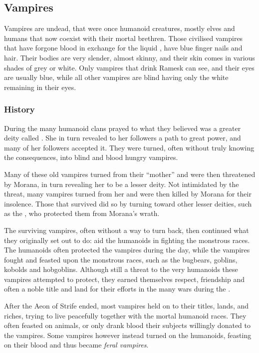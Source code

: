 \subsection{Vampires}
\label{sec:Vampires}

Vampires are undead, that were once humanoid creatures, mostly elves and
humans that now coexist with their mortal brethren. Those civilised vampires
that have forgone blood in exchange for the liquid , have
blue finger nails and hair. Their bodies are very slender, almost skinny, and
their skin comes in various shades of grey or white. Only vampires that drink
Ramesk can see, and their eyes are usually blue, while all other vampires are
blind having only the white remaining in their eyes.

\subsubsection{History}

During the  many humanoid clans prayed to what
they believed was a greater deity called . She in turn
revealed to her followers a path to great power, and many of her followers
accepted it. They were turned, often without truly knowing the consequences,
into blind and blood hungry vampires.

Many of these old vampires turned from their ``mother'' and were then
threatened by Morana, in turn revealing her to be a lesser deity. Not
intimidated by the threat, many vampires turned from her and were then killed
by Morana for their insolence. Those that survived did so by turning toward
other lesser deities, such as the , who protected
them from Morana's wrath.

The surviving vampires, often without a way to turn back, then continued
what they originally set out to do: aid the humanoids in fighting the
monstrous races. The humanoids often protected the vampires during the day,
while the vampires fought and feasted upon the monstrous races, such as the
bugbears, goblins, kobolds and hobgoblins. Although still a threat to the very
humanoids these vampires attempted to protect, they earned themselves respect,
friendship and often a noble title and land for their efforts in the many wars
during the .

After the Aeon of Strife ended, most vampires held on to their titles, lands,
and riches, trying to live peacefully together with the mortal humanoid races.
They often feasted on animals, or only drank blood their subjects willingly
donated to the vampires. Some vampires however instead turned on the humanoids,
feasting on their blood and thus became \emph{feral vampires}.

